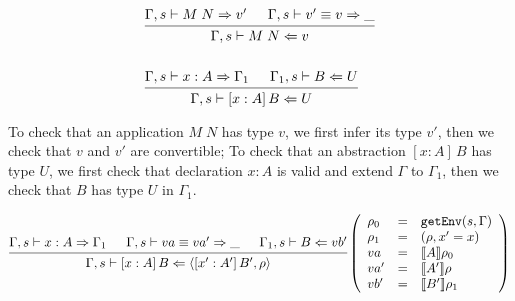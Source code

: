 \documentclass{article}
\theoremstyle{remark}
\begin{document}
\begin{align}
  &\begin{prooftree}
    \hypo{\Gamma,s \vdash M \; N \Rightarrow v'}
    \hypo{\Gamma,s \vdash v' \equiv v \Rightarrow \_}
    \infer2{\Gamma,s \vdash M \; N \Leftarrow v}
  \end{prooftree} \\
  \nonumber \\
  &\begin{prooftree}
    \hypo{\Gamma,s \vdash x : A \Rightarrow \Gamma_1}
    \hypo{\Gamma_1,s \vdash B \Leftarrow U}
    \infer2{\Gamma,s \vdash [x : A] \, B \Leftarrow U}
  \end{prooftree}\label{rule:abs}
\end{align}

To check that an application $M \; N$ has type $v$, we first infer its type $v'$, then we check that $v$ and $v'$ are convertible; To check that an abstraction $[x : A] \, B$ has type $U$, we first check that declaration $x : A$ is valid and extend $\Gamma$ to $\Gamma_1$, then we check that $B$ has type $U$ in $\Gamma_1$.

\begin{align}
  \begin{prooftree}
    \hypo{\Gamma,s \vdash x : A \Rightarrow \Gamma_1}
    \hypo{\Gamma,s \vdash va \equiv va' \Rightarrow \_}
    \hypo{\Gamma_1,s \vdash B \Leftarrow vb'}
    \infer3{\Gamma,s \vdash [x : A] \, B \Leftarrow \langle [x' : A'] \, B', \rho \rangle}
  \end{prooftree}\left(\begin{array}{l l l}
                         \rho_0 &= &\texttt{getEnv}(s, \Gamma) \\
                         \rho_1 &= &(\rho, x' = x) \\
                         va &= &\llbracket A \rrbracket \rho_0 \\
                         va' &= &\llbracket A' \rrbracket \rho \\
                         vb' &= &\llbracket B' \rrbracket \rho_1
                       \end{array}\right)
\end{align}
\end{document}
